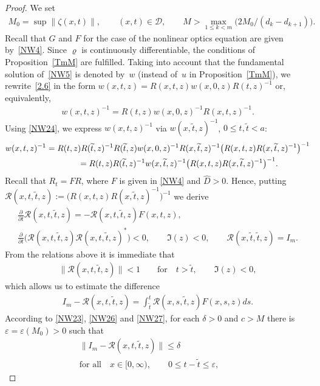 \documentclass[11pt]{article}
\def\vr{\varrho}
\def\ve{\varepsilon}
\def\wh{\widehat}
\def\wt{\widetilde}
\def\prt{\partial}
\newcommand{\cD}{{\mathcal D}}
\newcommand{\cR}{{\mathcal R}}
\numberwithin{equation}{section}
\begin{document}
\begin{proof} We set
\begin{gather} \label{NW23}
M_0=\sup\| \zeta(x,t)\|, \qquad (x,t)\in \cD, \qquad M>\max_{1\leq k<m}\big(2M_0/(d_k-d_{k+1})\big).
\end{gather}
Recall that $G$ and $F$ for the case of the nonlinear optics equation are given by~\eqref{NW4}. Since $\vr$ is continuously dif\/ferentiable, the conditions of Proposition~\ref{TmM}
are fulf\/illed. Taking into account that the fundamental solution of~\eqref{NW5} is denoted by~$w$
(instead of~$u$ in Proposition~\ref{TmM}), we rewrite~\eqref{2.6} in the form
$w(x,t,z)=R(x,t,z)w(x,0,z)R(t,z)^{-1}$ or, equivalently,
\begin{gather} \label{NW24}
w(x,t,z)^{-1}=R(t,z)w(x,0,z)^{-1}R(x,t,z)^{-1}.
\end{gather}
Using \eqref{NW24}, we express $w(x,t,z)^{-1}$ via $w(x,\wt t,z)^{-1}$, $0 \leq t,\wt t <a$:
\begin{gather}
w(x,t,z)^{-1} =R(t,z)R(\wt t,z)^{-1}R(\wt t,z)w(x,0,z)^{-1}R(x,\wt t,z)^{-1}\big(R(x,t,z)R(x,\wt t,z)^{-1}\big)^{-1}\nonumber\\
 \label{NW25}
 \hphantom{w(x,t,z)^{-1}}{}
 =R(t,z)R(\wt t,z)^{-1}w(x,\wt t,z)^{-1}\big(R(x,t,z)R(x,\wt t,z)^{-1}\big)^{-1}.
\end{gather}
Recall that $R_t=FR$, where $F$ is given in \eqref{NW4} and $\wh D>0$. Hence, putting $\cR(x,t, \wt t, z):=\big(R(x,t,z)R(x,\wt t,z)^{-1}\big)^{-1}$ we derive
\begin{gather*}
\frac{\prt}{\prt t} \cR(x,t, \wt t, z)=-\cR(x,t, \wt t, z)F(x,t,z), \\
\frac{\prt}{\prt t} \big(\cR(x,t, \wt t, z)\cR(x,t, \wt t, z)^*)<0, \qquad \Im(z)<0 , \qquad
 \cR(x,\wt t, \wt t, z)=I_m.
\end{gather*}
From the relations above it is immediate that
\begin{gather} \label{NW26}
\|\cR(x, t, \wt t, z)\|<1 \qquad {\mathrm{for}}\quad t>\wt t, \qquad \Im(z)<0,
\end{gather}
which allows us to estimate the dif\/ference
\begin{gather} \label{NW27}
I_m-\cR(x, t, \wt t, z)=\int_{\wt t}^t \cR(x, s, \wt t, z)F(x,s,z)ds.
\end{gather}
According to \eqref{NW23}, \eqref{NW26} and \eqref{NW27}, for each $\delta >0$ and $c>M$ there is $\ve=\ve(M_0)>0$ such that
\begin{gather} \label{NW28}
\| I_m-\cR(x, t, \wt t, z)\| \leq \delta
\\ \nonumber \text{for all} \quad x\in [0, \infty), \qquad \! 0\leq t-\wt t \leq \ve,\qquad\!

\end{gather}
\end{proof}
\end{document}
